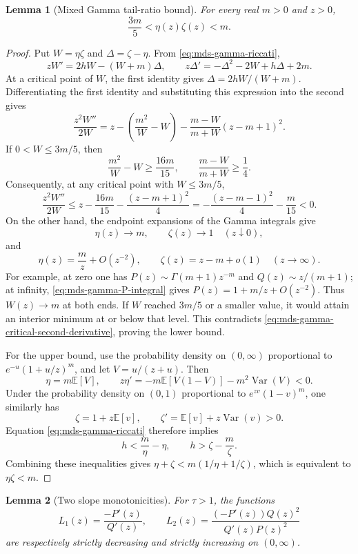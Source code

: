 \documentclass[11pt]{article}
\newtheorem{lemma}{Lemma}
\theoremstyle{definition}
\theoremstyle{remark}
\DeclareMathOperator{\Var}{Var}
\newcommand{\E}{\mathbb E}
\newcommand{\1}{\mathbf 1}
\begin{document}
\begin{lemma}[Mixed Gamma tail-ratio bound]
\label{lem:gamma-tail-ratio-bound}
For every real \(m>0\) and \(z>0\),
\[
  \frac{3m}{5}<\eta(z)\zeta(z)<m.
\]
\end{lemma}

\begin{proof}
Put \(W=\eta\zeta\) and \(\Delta=\zeta-\eta\).  From \eqref{eq:mds-gamma-riccati},
\[
  zW'=2hW-(W+m)\Delta,
  \qquad
  z\Delta'=-\Delta^2-2W+h\Delta+2m.
\]
At a critical point of \(W\), the first identity gives
\(\Delta=2hW/(W+m)\).  Differentiating the first identity and substituting this expression into the second gives
\begin{equation}
\label{eq:mds-gamma-critical-second-derivative}
  \frac{z^2W''}{2W}
  =z-\left(\frac{m^2}{W}-W\right)
     -\frac{m-W}{m+W}(z-m+1)^2.
\end{equation}
If \(0<W\le3m/5\), then
\[
  \frac{m^2}{W}-W\ge\frac{16m}{15},
  \qquad
  \frac{m-W}{m+W}\ge\frac14.
\]
Consequently, at any critical point with \(W\le3m/5\),
\[
  \frac{z^2W''}{2W}
  \le z-\frac{16m}{15}-\frac{(z-m+1)^2}{4}
  =-\frac{(z-m-1)^2}{4}-\frac m{15}<0.
\]
On the other hand, the endpoint expansions of the Gamma integrals give
\[
  \eta(z)\longrightarrow m,
  \qquad \zeta(z)\longrightarrow1
  \quad(z\downarrow0),
\]
and
\[
  \eta(z)=\frac mz+O(z^{-2}),
  \qquad \zeta(z)=z-m+o(1)
  \quad(z\to\infty).
\]
For example, at zero one has
\(P(z)\sim\Gamma(m+1)z^{-m}\) and \(Q(z)\sim z/(m+1)\); at infinity, \eqref{eq:mds-gamma-P-integral} gives \(P(z)=1+m/z+O(z^{-2})\).  Thus \(W(z)\to m\) at both ends.  If \(W\) reached \(3m/5\) or a smaller value, it would attain an interior minimum at or below that level.  This contradicts \eqref{eq:mds-gamma-critical-second-derivative}, proving the lower bound.

For the upper bound, use the probability density on \((0,\infty)\) proportional to \(e^{-u}(1+u/z)^m\), and let \(V=u/(z+u)\).  Then
\[
  \eta=m\E[V],
  \qquad
  z\eta'=-m\E[V(1-V)]-m^2\Var(V)<0.
\]
Under the probability density on \((0,1)\) proportional to \(e^{zv}(1-v)^m\), one similarly has
\[
  \zeta=1+z\E[v],
  \qquad
  \zeta'=\E[v]+z\Var(v)>0.
\]
Equation \eqref{eq:mds-gamma-riccati} therefore implies
\[
  h<\frac m\eta-\eta,
  \qquad
  h>\zeta-\frac m\zeta.
\]
Combining these inequalities gives
\(\eta+\zeta<m(1/\eta+1/\zeta)\), which is equivalent to \(\eta\zeta<m\).
\end{proof}

\begin{lemma}[Two slope monotonicities]
\label{lem:scaled-tail-auxiliary-monotonicity}
For \(\tau>1\), the functions
\[
  L_1(z)=\frac{-P'(z)}{Q'(z)},
  \qquad
  L_2(z)=\frac{(-P'(z))Q(z)^2}{Q'(z)P(z)^2}
\]
are respectively strictly decreasing and strictly increasing on \((0,\infty)\).
\end{lemma}
\end{document}
